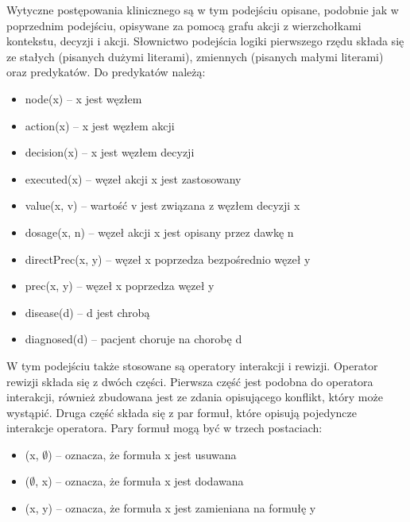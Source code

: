 Wytyczne postępowania klinicznego są w tym podejściu opisane, podobnie jak w poprzednim podejściu, opisywane za pomocą grafu akcji z wierzchołkami kontekstu, decyzji i akcji.\cite{SzWilk} Słownictwo podejścia logiki pierwszego rzędu składa się ze stałych (pisanych dużymi literami), zmiennych (pisanych małymi literami) oraz predykatów. Do predykatów należą:
\begin{itemize}
\item{node(x) – x jest węzłem}
\item{action(x) – x jest węzłem akcji}
\item{decision(x) – x jest węzłem decyzji}
\item{executed(x) – węzeł akcji x jest zastosowany}
\item{value(x, v) – wartość v jest związana z węzłem decyzji x}
\item{dosage(x, n) – węzeł akcji x jest opisany przez dawkę n}
\item{directPrec(x, y) – węzeł x poprzedza bezpośrednio węzeł y}
\item{prec(x, y) – węzeł x poprzedza węzeł y}
\item{disease(d) – d jest chrobą}
\item{diagnosed(d) – pacjent choruje na chorobę d}
\end{itemize}
W tym podejściu także stosowane są operatory interakcji i rewizji. Operator rewizji składa się z dwóch części. Pierwsza część jest podobna do operatora interakcji, również zbudowana jest ze zdania opisującego konflikt, który może wystąpić. Druga część składa się z par formuł, które opisują pojedyncze interakcje operatora. Pary formuł mogą być w trzech postaciach:
\begin{itemize}
\item{(x, $\emptyset$) – oznacza, że formuła x jest usuwana}
\item{($\emptyset$, x) – oznacza, że formuła x jest dodawana}
\item{(x, y) – oznacza, że formuła x jest zamieniana na formułę y}
\end{itemize}


